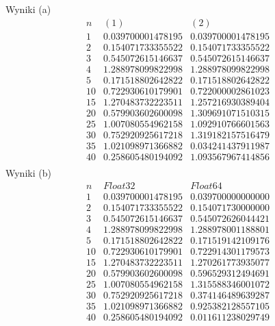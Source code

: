 Wyniki (a)
$$
\begin{array}{c|c|c}
n & (1) & (2)\\
\hline
1 & 0.039700001478195 & 0.039700001478195\\
2 & 0.154071733355522 & 0.154071733355522\\
3 & 0.545072615146637 & 0.545072615146637\\
4 & 1.288978099822998 & 1.288978099822998\\
5 & 0.171518802642822 & 0.171518802642822\\
10 & 0.722930610179901 & 0.722000002861023\\
15 & 1.270483732223511 & 1.257216930389404\\
20 & 0.579903602600098 & 1.309691071510315\\
25 & 1.007080554962158 & 1.092910766601563\\
30 & 0.752920925617218 & 1.319182157516479\\
35 & 1.021098971366882 & 0.034241437911987\\
40 & 0.258605480194092 & 1.093567967414856\\
\end{array}
$$
Wyniki (b)
$$
\begin{array}{c|c|c}
n & Float32 & Float64\\
\hline
1 & 0.039700001478195 & 0.039700000000000\\
2 & 0.154071733355522 & 0.154071730000000\\
3 & 0.545072615146637 & 0.545072626044421\\
4 & 1.288978099822998 & 1.288978001188801\\
5 & 0.171518802642822 & 0.171519142109176\\
10 & 0.722930610179901 & 0.722914301179573\\
15 & 1.270483732223511 & 1.270261773935077\\
20 & 0.579903602600098 & 0.596529312494691\\
25 & 1.007080554962158 & 1.315588346001072\\
30 & 0.752920925617218 & 0.374146489639287\\
35 & 1.021098971366882 & 0.925382128557105\\
40 & 0.258605480194092 & 0.011611238029749\\
\end{array}
$$
